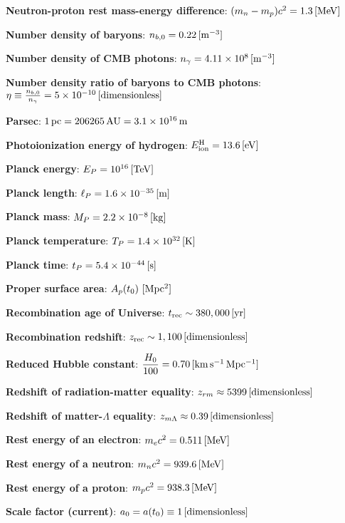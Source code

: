 \documentclass[a4paper,11pt]{article}
\begin{document}
{\noindent}\textbf{Neutron-proton rest mass-energy difference}: $(m_n-m_p)c^2 = 1.3\,[{\rm MeV}]$

{\noindent}\textbf{Number density of baryons}: $n_{b,0} = 0.22\,[{\rm m^{-3}}]$

{\noindent}\textbf{Number density of CMB photons}: $n_\gamma= 4.11\times10^8\,[{\rm m^{-3}}]$

{\noindent}\textbf{Number density ratio of baryons to CMB photons}: $\eta \equiv \frac{n_{b,0}}{n_\gamma} = 5\times10^{-10}\,[{\rm dimensionless}]$

{\noindent}\textbf{Parsec}: $1\,{\rm pc} = 206265\,{\rm AU} = 3.1\times10^{16}\,{\rm m}$

{\noindent}\textbf{Photoionization energy of hydrogen}: $E^\mathrm{H}_\mathrm{ion} = 13.6\,[{\rm eV}]$

{\noindent}\textbf{Planck energy}: $E_P = 10^{16}\,[{\rm TeV}]$

{\noindent}\textbf{Planck length}: $\ell_P = 1.6\times10^{-35}\,[{\rm m}]$

{\noindent}\textbf{Planck mass}: $M_P = 2.2\times10^{-8}\,[{\rm kg}]$

{\noindent}\textbf{Planck temperature}: $T_P = 1.4\times10^{32}\,[{\rm K}]$

{\noindent}\textbf{Planck time}: $t_P = 5.4\times10^{-44}\,[{\rm s}]$

{\noindent}\textbf{Proper surface area}: $A_p(t_0) ~ [{\rm Mpc^2}]$

{\noindent}\textbf{Recombination age of Universe}: $t_\mathrm{rec} \sim 380,000\,[{\rm yr}]$

{\noindent}\textbf{Recombination redshift}: $z_\mathrm{rec}\sim1,100\,[{\rm dimensionless}]$

{\noindent}\textbf{Reduced Hubble constant}: $\dfrac{H_0}{100} = 0.70\,[{\rm km\,s^{-1}\,Mpc^{-1}}]$

{\noindent}\textbf{Redshift of radiation-matter equality}: $z_{rm} \approx 5399\,[{\rm dimensionless}]$

{\noindent}\textbf{Redshift of matter-$\Lambda$ equality}: $z_{m\Lambda}
\approx0.39\,[{\rm dimensionless}]$

{\noindent}\textbf{Rest energy of an electron}: $m_ec^2 = 0.511\,[{\rm MeV}]$

{\noindent}\textbf{Rest energy of a neutron}: $m_nc^2 = 939.6\,[{\rm MeV}]$

{\noindent}\textbf{Rest energy of a proton}: $m_pc^2 = 938.3\,[{\rm MeV}]$

{\noindent}\textbf{Scale factor (current)}: $a_0=a(t_0)\equiv1\,[{\rm dimensionless}]$
\end{document}
